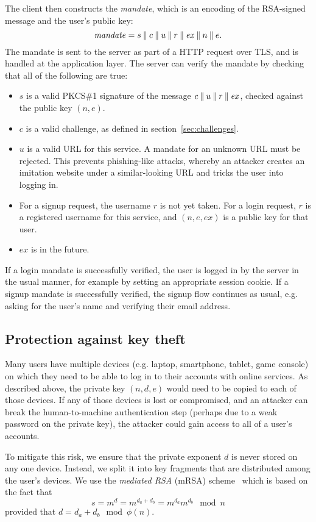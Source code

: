 The client then constructs the \emph{mandate}, which is an encoding of the RSA-signed message and
the user's public key: $$\mathit{mandate} = s \mathbin{\|} c \mathbin{\|} u \mathbin{\|} r \mathbin{\|} \mathit{ex} \mathbin{\|} n \mathbin{\|} e.$$
The mandate is sent to the server as part of a HTTP request over TLS, and is handled at the
application layer. The server can verify the mandate by checking that all of the following are true:
\begin{itemize}
\item $s$ is a valid PKCS\#1 signature of the message $c \mathbin{\|} u \mathbin{\|} r \mathbin{\|} \mathit{ex}$,
checked against the public key $(n, e)$.
\item $c$ is a valid challenge, as defined in section~\ref{sec:challenges}.
\item $u$ is a valid URL for this service. A mandate for an unknown URL must be rejected. This
prevents phishing-like attacks, whereby an attacker creates an imitation website under a
similar-looking URL and tricks the user into logging in.
\item For a signup request, the username $r$ is not yet taken. For a login request, $r$ is a
registered username for this service, and $(n, e, \mathit{ex})$ is a public key for that user.
\item $\mathit{ex}$ is in the future.
\end{itemize}

If a login mandate is successfully verified, the user is logged in by the server in the usual
manner, for example by setting an appropriate session cookie. If a signup mandate is successfully
verified, the signup flow continues as usual, e.g. asking for the user's name and verifying their
email address.

\subsection{Protection against key theft}\label{sec:revocation}

Many users have multiple devices (e.g. laptop, smartphone, tablet, game console) on which they need
to be able to log in to their accounts with online services. As described above, the private key
$(n, d, e)$ would need to be copied to each of those devices. If any of those devices is lost or
compromised, and an attacker can break the human-to-machine authentication step (perhaps due to a
weak password on the private key), the attacker could gain access to all of a user's accounts.

To mitigate this risk, we ensure that the private exponent $d$ is never stored on any one device.
Instead, we split it into key fragments that are distributed among the user's devices. We use the
\emph{mediated RSA} (mRSA) scheme~\cite{Boneh01,Kutyiowski12} which is based on the fact that
$$s = m^d = m^{d_a + d_b} = m^{d_a} m^{d_b} \mod n$$ provided that $d = d_a + d_b \mod \phi(n)$.

